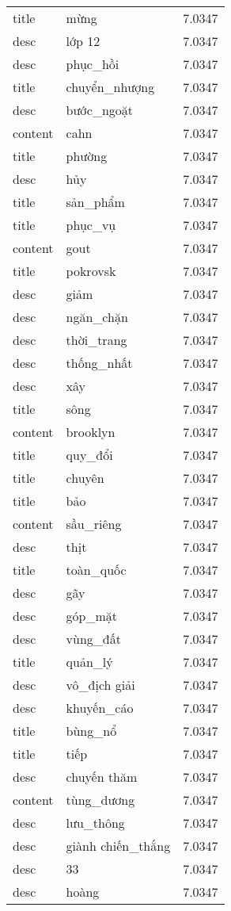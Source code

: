 \documentclass{article}
\begin{document}
\begin{tabular}{lll}
title & mừng & 7.0347\\
desc & lớp 12 & 7.0347\\
desc & phục\_hồi & 7.0347\\
title & chuyển\_nhượng & 7.0347\\
desc & bước\_ngoặt & 7.0347\\
content & cahn & 7.0347\\
title & phường & 7.0347\\
desc & hủy & 7.0347\\
title & sản\_phẩm & 7.0347\\
title & phục\_vụ & 7.0347\\
content & gout & 7.0347\\
title & pokrovsk & 7.0347\\
desc & giảm & 7.0347\\
desc & ngăn\_chặn & 7.0347\\
desc & thời\_trang & 7.0347\\
desc & thống\_nhất & 7.0347\\
desc & xây & 7.0347\\
title & sông & 7.0347\\
content & brooklyn & 7.0347\\
title & quy\_đổi & 7.0347\\
title & chuyên & 7.0347\\
title & bảo & 7.0347\\
content & sầu\_riêng & 7.0347\\
desc & thịt & 7.0347\\
title & toàn\_quốc & 7.0347\\
desc & gãy & 7.0347\\
desc & góp\_mặt & 7.0347\\
desc & vùng\_đất & 7.0347\\
title & quản\_lý & 7.0347\\
desc & vô\_địch giải & 7.0347\\
desc & khuyến\_cáo & 7.0347\\
title & bùng\_nổ & 7.0347\\
title & tiếp & 7.0347\\
desc & chuyến thăm & 7.0347\\
content & tùng\_dương & 7.0347\\
desc & lưu\_thông & 7.0347\\
desc & giành chiến\_thắng & 7.0347\\
desc & 33 & 7.0347\\
desc & hoàng & 7.0347\\

\end{tabular}
\end{document}
